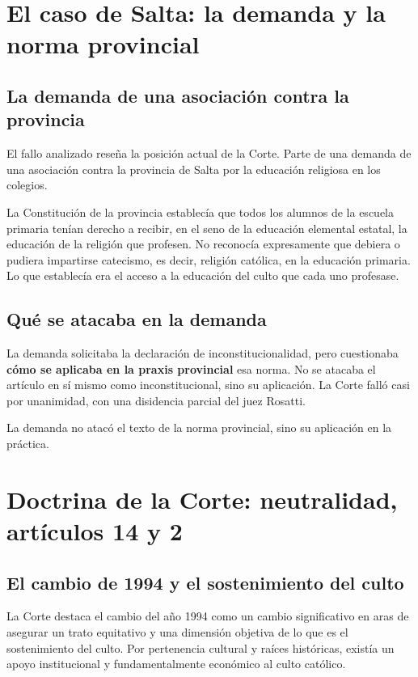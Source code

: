 \documentclass[12pt,oneside]{book}
\begin{document}
\section{El caso de Salta: la demanda y la norma provincial}

\subsection{La demanda de una asociación contra la provincia}

El fallo analizado reseña la posición actual de la Corte. Parte de una demanda de una asociación contra la provincia de Salta por la educación religiosa en los colegios.

La Constitución de la provincia establecía que todos los alumnos de la escuela primaria tenían derecho a recibir, en el seno de la educación elemental estatal, la educación de la religión que profesen. No reconocía expresamente que debiera o pudiera impartirse catecismo, es decir, religión católica, en la educación primaria. Lo que establecía era el acceso a la educación del culto que cada uno profesase.

\subsection{Qué se atacaba en la demanda}

La demanda solicitaba la declaración de inconstitucionalidad, pero cuestionaba \textbf{cómo se aplicaba en la praxis provincial} esa norma. No se atacaba el artículo en sí mismo como inconstitucional, sino su aplicación. La Corte falló casi por unanimidad, con una disidencia parcial del juez Rosatti.

\begin{important}
La demanda no atacó el texto de la norma provincial, sino su aplicación en la práctica.
\end{important}

\section{Doctrina de la Corte: neutralidad, artículos 14 y 2}

\subsection{El cambio de 1994 y el sostenimiento del culto}

La Corte destaca el cambio del año 1994 como un cambio significativo en aras de asegurar un trato equitativo y una dimensión objetiva de lo que es el sostenimiento del culto. Por pertenencia cultural y raíces históricas, existía un apoyo institucional y fundamentalmente económico al culto católico.
\end{document}
